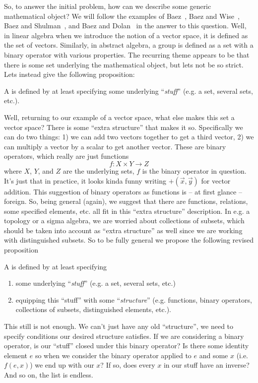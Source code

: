 So, to answer the initial problem, how can we describe some
generic mathematical object? We will follow the examples of
Baez~\cite{Baez:2004pa}, Baez and Wise~\cite{BaezWise:2004ln},
Baez and Shulman~\cite{baez-2006}, and Baez and Dolan~\cite{baez-2001-1} in
the answer to this question. Well, in linear algebra when we
introduce the notion of a vector space, it is defined as the set
of vectors. Similarly, in abstract algebra, a group is defined as
a set with a binary operator with various properties. The
recurring theme appears to be that there is some set underlying
the mathematical object, but lets not be so strict. Lets instead
give the following proposition:
\begin{prop}%
A  is defined by at least specifying
some underlying ``\emph{stuff}'' (e.g. a set, several sets, etc.).
\end{prop}
Well, returning to our example of a vector space, what else makes
this set a vector space? There is some ``extra structure'' that
makes it so. Specifically we can do two things: 1) we can add two
vectors together to get a third vector, 2) we can multiply a
vector by a scalar to get another vector. These are binary
operators, which really are just functions
\begin{equation}%
f:X\times Y\to Z
\end{equation}
where $X$, $Y$, and $Z$ are the underlying sets, $f$ is the
binary operator in question. It's just that in practice, it looks
kinda funny writing $+(\vec{x},\vec{y})$ for vector addition.
This suggestion of binary operators as functions is -- at first
glance -- foreign. So, being general (again), we suggest that
there are functions, relations, some specified elements, etc. all
fit in this ``extra structure'' description. In e.g. a topology
or a sigma algebra, we are worried about collections of subsets,
which should be taken into account as ``extra structure'' as well
since we are working with distinguished subsets. So to be fully
general we propose the following revised proposition
\begin{prop}%
A  is defined by at least specifying
\begin{enumerate}
\item some underlying ``\emph{stuff}'' (e.g. a set, several sets, etc.)
\item equipping this ``stuff'' with some ``\emph{structure}''
  (e.g. functions, binary operators, collections of subsets,
  distinguished elements, etc.).
\end{enumerate}
\end{prop}
This still is not enough. We can't just have any old
``structure'', we need to specify conditions our desired
structure satisfies. If we are considering a binary operator, is
our ``stuff'' closed under this binary operator? Is there some
identity element $e$ so when we consider the binary operator
applied to $e$ and some $x$ (i.e. $f(e,x)$) we end up with our
$x$? If so, does every $x$ in our stuff have an inverse? And so
on, the list is endless.

